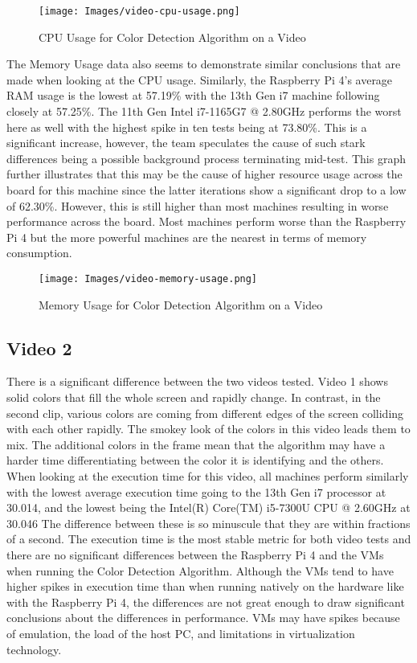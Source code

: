 \begin{figure}
    \centering
    \texttt{[image: Images/video-cpu-usage.png]}
    \caption{CPU Usage for Color Detection Algorithm on a Video}
\end{figure}

The Memory Usage data also seems to demonstrate similar conclusions that
are made when looking at the CPU usage. Similarly, the Raspberry Pi 4's
average RAM usage is the lowest at 57.19\% with the 13th Gen i7 machine
following closely at 57.25\%. The 11th Gen Intel i7-1165G7 @ 2.80GHz
performs the worst here as well with the highest spike in ten tests
being at 73.80\%. This is a significant increase, however, the team
speculates the cause of such stark differences being a possible
background process terminating mid-test. This graph further
illustrates that this may be the cause of higher resource usage across
the board for this machine since the latter iterations show a
significant drop to a low of 62.30\%. However, this is still higher
than most machines resulting in worse performance across the board. Most
machines perform worse than the Raspberry Pi 4 but the more powerful
machines are the nearest in terms of memory consumption.

\begin{figure}
    \centering
    \texttt{[image: Images/video-memory-usage.png]}
    \caption{Memory Usage for Color Detection Algorithm on a Video}
\end{figure}

\subsection{Video 2}

There is a significant difference between the two videos
tested. Video 1 shows solid colors that fill the whole screen and
rapidly change. In contrast, in the second clip, various colors are
coming from different edges of the screen colliding with each other
rapidly. The smokey look of the colors in this video leads them to mix.
The additional colors in the frame mean that the algorithm may have a
harder time differentiating between the color it is identifying and the
others. When looking at the execution time for this video, all machines
perform similarly with the lowest average execution time going to the
13th Gen i7 processor at 30.014, and the lowest being the Intel(R)
Core(TM) i5-7300U CPU @ 2.60GHz at 30.046 The difference between these
is so minuscule that they are within fractions of a second. The
execution time is the most stable metric for both video tests and there
are no significant differences between the Raspberry Pi 4 and the VMs
when running the Color Detection Algorithm. Although the VMs tend to
have higher spikes in execution time than when running natively on the
hardware like with the Raspberry Pi 4, the differences are not great
enough to draw significant conclusions about the differences in
performance. VMs may have spikes because of emulation, the load of the
host PC, and limitations in virtualization technology.

